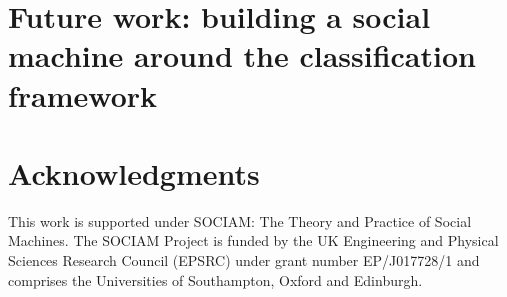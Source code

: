 \documentclass{sig-alternate}
\begin{document}
\section{Future work: building a social machine around the classification framework}




\section{Acknowledgments}

This work is supported under SOCIAM: The Theory and Practice of Social Machines.  The SOCIAM Project is funded by the UK Engineering and Physical Sciences Research Council (EPSRC) under grant number EP/J017728/1 and comprises the Universities of Southampton, Oxford and Edinburgh.

%

%
%


\balancecolumns %
\end{document}
